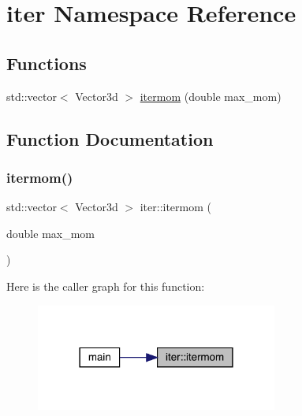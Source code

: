 \hypertarget{namespaceiter}{}\section{iter Namespace Reference}
\label{namespaceiter}
\subsection*{Functions}
\begin{DoxyCompactItemize}
\item 
std\+::vector$<$ Vector3d $>$ \mbox{\hyperlink{namespaceiter_aa428f19b82dc5b65f03be5db13925f71}{itermom}} (double max\+\_\+mom)
\end{DoxyCompactItemize}


\subsection{Function Documentation}
\mbox{\label{namespaceiter_aa428f19b82dc5b65f03be5db13925f71}} 
\subsubsection{\texorpdfstring{itermom()}{itermom()}}
{\footnotesize\ttfamily std\+::vector$<$ Vector3d $>$ iter\+::itermom (\begin{DoxyParamCaption}\item[{double}]{max\+\_\+mom }\end{DoxyParamCaption})}

Here is the caller graph for this function\+:
\nopagebreak
\begin{figure}[H]
\begin{center}
\leavevmode
\includegraphics[width=225pt]{d1/d0f/namespaceiter_aa428f19b82dc5b65f03be5db13925f71_icgraph}
\end{center}
\end{figure}
